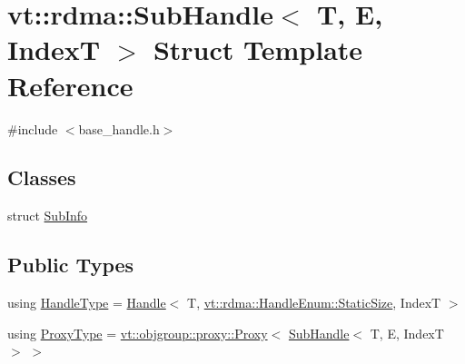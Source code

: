 \hypertarget{structvt_1_1rdma_1_1_sub_handle}{}\section{vt\+:\+:rdma\+:\+:Sub\+Handle$<$ T, E, IndexT $>$ Struct Template Reference}
\label{structvt_1_1rdma_1_1_sub_handle}


{\ttfamily \#include $<$base\+\_\+handle.\+h$>$}

\subsection*{Classes}
\begin{DoxyCompactItemize}
\item 
struct \hyperlink{structvt_1_1rdma_1_1_sub_handle_1_1_sub_info}{Sub\+Info}
\end{DoxyCompactItemize}
\subsection*{Public Types}
\begin{DoxyCompactItemize}
\item 
using \hyperlink{structvt_1_1rdma_1_1_sub_handle_a782bd6ddc85c6a81d7f55d207fad71cd}{Handle\+Type} = \hyperlink{structvt_1_1rdma_1_1_handle}{Handle}$<$ T, \hyperlink{namespacevt_1_1rdma_a0234ff19cfb3c04718cfdfd36b2d6d88a0c5c41d6a0319a61d3a5e8a060b7c4d7}{vt\+::rdma\+::\+Handle\+Enum\+::\+Static\+Size}, IndexT $>$
\item 
using \hyperlink{structvt_1_1rdma_1_1_sub_handle_a758bee2e499658cfef92ace83eea6590}{Proxy\+Type} = \hyperlink{structvt_1_1objgroup_1_1proxy_1_1_proxy}{vt\+::objgroup\+::proxy\+::\+Proxy}$<$ \hyperlink{structvt_1_1rdma_1_1_sub_handle}{Sub\+Handle}$<$ T, E, IndexT $>$ $>$
\end{DoxyCompactItemize}
